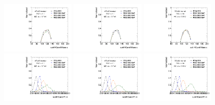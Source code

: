\begin{figure}[htbp!]
\begin{center}
\includegraphics[width=0.32\textwidth,angle=-90]{figures/boosted/Truth/Moriond_comp_0_FourTag_Signal_sublHCand_Mass_s.pdf}
\includegraphics[width=0.32\textwidth,angle=-90]{figures/boosted/Truth/Moriond_comp_0_ThreeTag_Signal_sublHCand_Mass_s.pdf}
\includegraphics[width=0.32\textwidth,angle=-90]{figures/boosted/Truth/Moriond_comp_0_TwoTag_split_Signal_sublHCand_Mass_s.pdf}\\
\includegraphics[width=0.32\textwidth,angle=-90]{figures/boosted/Truth/Moriond_comp_0_FourTag_Signal_sublHCand_Pt_m.pdf}
\includegraphics[width=0.32\textwidth,angle=-90]{figures/boosted/Truth/Moriond_comp_0_ThreeTag_Signal_sublHCand_Pt_m.pdf}
\includegraphics[width=0.32\textwidth,angle=-90]{figures/boosted/Truth/Moriond_comp_0_TwoTag_split_Signal_sublHCand_Pt_m.pdf}\\

\end{center}
\end{figure}
